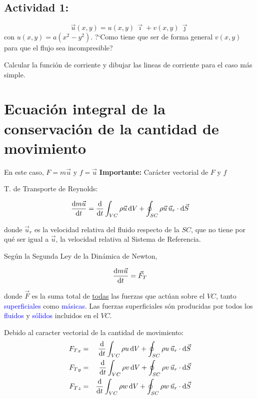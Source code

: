 	
\subsection*{Actividad 1:}
		\[
		\vec{u}(x,y)=u(x,y)\,\vec{\imath}+v(x,y)\,\vec{\jmath}
		\]
		con $u(x,y)=a(x^{2}-y^{2})$. ?`Como tiene que ser de forma general
		$v(x,y)$ para que el flujo sea incompresible?
		
		Calcular la función de corriente y dibujar las lineas de corriente
		para el caso más simple.

\section{Ecuación integral de la conservación de la cantidad de movimiento}

	
	En este caso, $F=m\vec{u}$ y $f=\vec{u}$
	\textbf{Importante:}
		Carácter vectorial de $F$ y $f$
	
	T. de Transporte de Reynolds: 
	
	\begin{equation}
		\frac{\textrm{d} m\vec{u}}{\textrm{d} t}=\frac{\textrm{d} \phantom{}}{\textrm{d} t}\int_{VC}\rho\vec{u}\,\text{d}V+\oint_{SC}\rho\vec{u}\,\vec{u}_{r}\cdot\text{d}\vec{S}
	\end{equation}
	
	donde $\vec{u}_{r}$ es la velocidad relativa del fluido respecto
	de la $SC$, que no tiene por qué ser igual a $\vec{u}$, la velocidad
	relativa al Sistema de Referencia.

	
	Según la Segunda Ley de la Dinámica de Newton, 
	
\begin{equation}
		\frac{\textrm{d} m\vec{u}}{\textrm{d} t}=\vec{F}_{T}
\end{equation}
	
	donde $\vec{F}$ es la suma total de \underline{todas} las fuerzas
	que actúan sobre el $VC$, tanto \textcolor{blue}{superficiales} como
	\textcolor{blue}{másicas}. Las fuerzas superficiales són producidas
	por todos los \textcolor{blue}{fluidos} y \textcolor{blue}{sólidos}
	incluidos en el $VC$.
	
	Debido al caracter vectorial de la cantidad de movimiento: 
	\begin{eqnarray}
		{F_{T}}_{x} & = & \frac{\textrm{d} \phantom{}}{\textrm{d} t}\int_{VC}\rho u\,\text{d}V+\oint_{SC}\rho u\,\vec{u}_{r}\cdot\text{d}\vec{S}\\
		{F_{T}}_{y} & = & \frac{\textrm{d} \phantom{}}{\textrm{d} t}\int_{VC}\rho v\,\text{d}V+\oint_{SC}\rho v\,\vec{u}_{r}\cdot\text{d}\vec{S}\\
		{F_{T}}_{z} & = & \frac{\textrm{d} \phantom{}}{\textrm{d} t}\int_{VC}\rho w\,\text{d}V+\oint_{SC}\rho w\,\vec{u}_{r}\cdot\text{d}\vec{S}
	\end{eqnarray}
	


